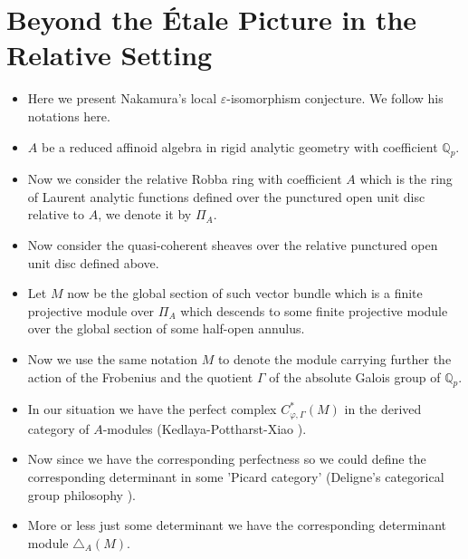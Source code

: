 \documentclass[11pt]{report}
\begin{document}
\newpage

\section{Beyond the \'Etale Picture in the Relative Setting}


\begin{itemize}
\item<1-> Here we present Nakamura's local $\varepsilon$-isomorphism conjecture. We follow his notations here.
\item<2-> $A$ be a reduced affinoid algebra in rigid analytic geometry  with coefficient $\mathbb{Q}_p$.
\item<3-> Now we consider the relative Robba ring with coefficient $A$ which is the ring of Laurent analytic functions defined over the punctured open unit disc relative to $A$, we denote it by $\Pi_{A}$.
\item<4-> Now consider the quasi-coherent sheaves over the relative punctured open unit disc defined above.  
\item<5-> Let $M$ now be the global section of such vector bundle which is a finite projective module over $\Pi_{A}$ which descends to some finite projective module over the global section of some half-open annulus. 
\item<6-> Now we use the same notation $M$ to denote the module carrying further the action of the Frobenius and the quotient $\Gamma$ of the absolute Galois group of $\mathbb{Q}_p$.
\item<7-> In our situation we have the perfect complex $C^*_{\varphi,\Gamma}(M)$ in the derived category of $A$-modules (Kedlaya-Pottharst-Xiao \cite[Theorem, Chapter 1]{KPX}).  
\item<8-> Now since we have the corresponding perfectness so we could define the corresponding determinant in some 'Picard category' (Deligne's categorical group philosophy \cite[Chapitre 4]{De3}). 
	
\item<9-> More or less just some determinant we have the corresponding determinant module $\triangle_A(M)$.
\end{itemize} 	
\end{document}
